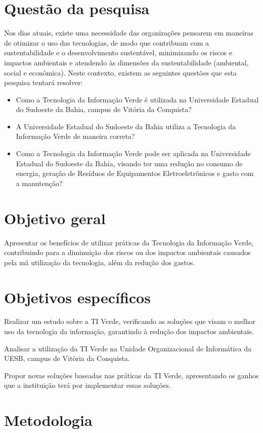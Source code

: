 \section{Questão da pesquisa}
Nos dias atuais, existe uma necessidade das organizações pensarem em maneiras de otimizar o uso das tecnologias, de modo que contribuam com a sustentabilidade e o desenvolvimento sustentável, minimizando os riscos e impactos ambientais e atendendo às dimensões da sustentabilidade (ambiental, social e econômica). Neste contexto, existem as seguintes questões que esta pesquisa tentará resolver:
\begin{itemize}
    \item Como a Tecnologia da Informação Verde é utilizada na Universidade Estadual do Sudoeste da Bahia, campus de Vitória da Conquista?
    \item A Universidade Estadual do Sudoeste da Bahia utiliza a Tecnologia da Informação Verde de maneira correta?
    \item Como a Tecnologia da Informação Verde pode ser aplicada na Universidade Estadual do Sudoeste da Bahia, visando ter uma redução no consumo de energia, geração de Resíduos de Equipamentos Eletroeletrônicos e gasto com a manutenção?
\end{itemize}

\section{Objetivo geral}
Apresentar os benefícios de utilizar práticas da Tecnologia da Informação Verde, contribuindo para a diminuição dos riscos ou dos impactos ambientais causados pela má utilização da tecnologia, além da redução dos gastos. 

\section{Objetivos específicos}
Realizar um estudo sobre a TI Verde, verificando as soluções que visam o melhor uso da tecnologia da informação, garantindo à redução dos impactos ambientais.
 
Analisar a utilização da TI Verde na Unidade Organizacional de Informática da UESB, campus de Vitória da Conquista.  

Propor novas soluções baseadas nas práticas da TI Verde, apresentando os ganhos que a instituição terá por implementar essas soluções.


\section{Metodologia}

